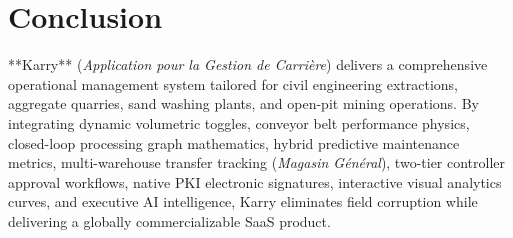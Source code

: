 \documentclass[11pt, a4paper]{article}
\begin{document}
\section{Conclusion}
\noindent
**Karry** (\textit{Application pour la Gestion de Carri\`ere}) delivers a comprehensive operational management system tailored for civil engineering extractions, aggregate quarries, sand washing plants, and open-pit mining operations. By integrating dynamic volumetric toggles, conveyor belt performance physics, closed-loop processing graph mathematics, hybrid predictive maintenance metrics, multi-warehouse transfer tracking (\textit{Magasin G\'en\'eral}), two-tier controller approval workflows, native PKI electronic signatures, interactive visual analytics curves, and executive AI intelligence, Karry eliminates field corruption while delivering a globally commercializable SaaS product.
\end{document}

